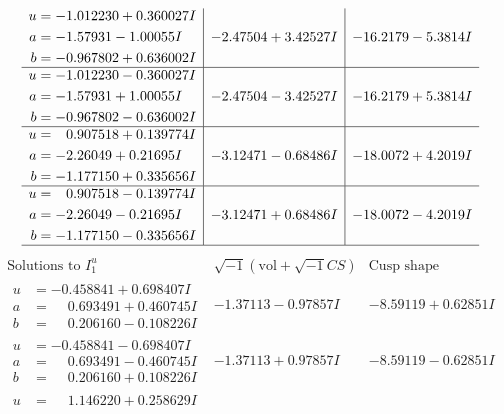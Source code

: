 \documentclass[1p]{elsarticle_modified}
\theoremstyle{definition}
\newcommand{\I}{\sqrt{-1}}
\begin{document}
$$\begin{array}{c|c|c}
\begin{aligned}
u &= -1.012230 + 0.360027 I \\
a &= -1.57931 - 1.00055 I \\
b &= -0.967802 + 0.636002 I\end{aligned}
 & -2.47504 + 3.42527 I & -16.2179 - 5.3814 I \\ \hline\begin{aligned}
u &= -1.012230 - 0.360027 I \\
a &= -1.57931 + 1.00055 I \\
b &= -0.967802 - 0.636002 I\end{aligned}
 & -2.47504 - 3.42527 I & -16.2179 + 5.3814 I \\ \hline\begin{aligned}
u &= \phantom{-}0.907518 + 0.139774 I \\
a &= -2.26049 + 0.21695 I \\
b &= -1.177150 + 0.335656 I\end{aligned}
 & -3.12471 - 0.68486 I & -18.0072 + 4.2019 I \\ \hline\begin{aligned}
u &= \phantom{-}0.907518 - 0.139774 I \\
a &= -2.26049 - 0.21695 I \\
b &= -1.177150 - 0.335656 I\end{aligned}
 & -3.12471 + 0.68486 I & -18.0072 - 4.2019 I\\
 \hline 
 \end{array}$$\newpage$$\begin{array}{c|c|c}  
\text{Solutions to }I^u_{1}& \I (\text{vol} + \sqrt{-1}CS) & \text{Cusp shape}\\
 \hline 
\begin{aligned}
u &= -0.458841 + 0.698407 I \\
a &= \phantom{-}0.693491 + 0.460745 I \\
b &= \phantom{-}0.206160 - 0.108226 I\end{aligned}
 & -1.37113 - 0.97857 I & -8.59119 + 0.62851 I \\ \hline\begin{aligned}
u &= -0.458841 - 0.698407 I \\
a &= \phantom{-}0.693491 - 0.460745 I \\
b &= \phantom{-}0.206160 + 0.108226 I\end{aligned}
 & -1.37113 + 0.97857 I & -8.59119 - 0.62851 I \\ \hline\begin{aligned}
u &= \phantom{-}1.146220 + 0.258629 I \\

\end{aligned}
\end{array}$$
\end{document}
